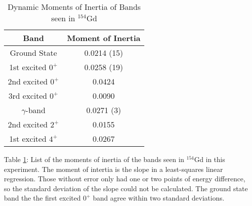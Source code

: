 \begin{table}[!]
    \centering
    \caption{Dynamic Moments of Inertia of Bands seen in $^{154}$Gd}
    \begin{tabular}{c|c}
        \toprule
        Band & Moment of Inertia  \\
        \hline
        Ground State & 0.0214 (15) \\
        1st excited $0^+$ & 0.0258 (19) \\
        2nd excited $0^+$ & 0.0424 \\
        3rd excited $0^+$ & 0.0090 \\
        $\gamma$-band & 0.0271 (3) \\
        2nd excited $2^+$ & 0.0155 \\
        1st excited $4^+$ & 0.0267 \\
        \bottomrule
    \end{tabular}
    \footnotesize
    \item Table \ref{tab:154_Dynamic}: List of the moments of inertia of the bands seen in $^{154}$Gd in this experiment. The moment of intertia is the slope in a least-squares linear regression. Those without error only had one or two points of energy difference, so the standard deviation of the slope could not be calculated. The ground state band the the first excited $0^+$ band agree within two standard deviations.
    \label{tab:154_Dynamic}
\end{table}